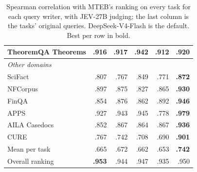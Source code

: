 \begin{table}[t]
\begin{tabular}{lrrrrr}
TheoremQA Theorems & .916 & .917 & \textbf{.942} & .912 & .920 \\
\midrule
\multicolumn{6}{l}{\textit{Other domains}} \\
SciFact & .807 & .767 & .849 & .771 & \textbf{.872} \\
NFCorpus & .897 & .875 & .827 & .865 & \textbf{.930} \\
FinQA & .854 & .876 & .862 & .892 & \textbf{.946} \\
APPS & .927 & .943 & .945 & .778 & \textbf{.979} \\
AILA Casedocs & .852 & .867 & .864 & .867 & \textbf{.936} \\
CURE & .767 & .742 & .708 & .690 & \textbf{.901} \\
\midrule
Mean per task & .665 & .672 & .662 & .653 & \textbf{.742} \\
Overall ranking & \textbf{.953} & .944 & .947 & .935 & .950 \\
\bottomrule
\end{tabular}
\caption{Spearman correlation with MTEB's ranking on every task for each query writer, with JEV-27B judging; the last column is the tasks' original queries. DeepSeek-V4-Flash is the default. Best per row in bold.}
\label{tab:all_writers}
\end{table}
